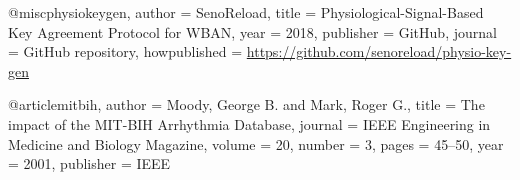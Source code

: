 @misc{physiokeygen,
  author = {SenoReload},
  title = {Physiological-Signal-Based Key Agreement Protocol for WBAN},
  year = {2018},
  publisher = {GitHub},
  journal = {GitHub repository},
  howpublished = {\url{https://github.com/senoreload/physio-key-gen}}
}

@article{mitbih,
  author = {Moody, George B. and Mark, Roger G.},
  title = {The impact of the MIT-BIH Arrhythmia Database},
  journal = {IEEE Engineering in Medicine and Biology Magazine},
  volume = {20},
  number = {3},
  pages = {45--50},
  year = {2001},
  publisher = {IEEE}
}